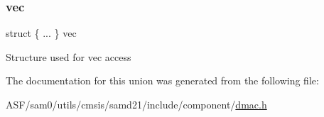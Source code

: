 \subsubsection{\texorpdfstring{vec}{vec}}
{\footnotesize\ttfamily struct \{ ... \}   vec}

Structure used for vec access 

The documentation for this union was generated from the following file\+:\begin{DoxyCompactItemize}
\item 
A\+S\+F/sam0/utils/cmsis/samd21/include/component/\mbox{\hyperlink{component_2dmac_8h}{dmac.\+h}}\end{DoxyCompactItemize}
